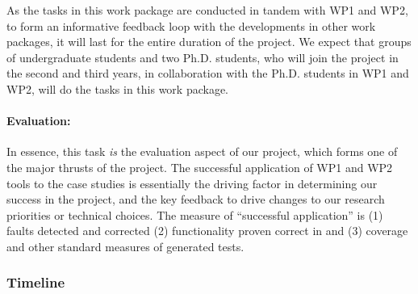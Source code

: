 As the tasks in this work package are conducted in tandem with WP1 and WP2, to form an informative feedback loop with the developments in other work packages, it will last for the entire duration of the project.
We expect that groups of undergraduate students and two Ph.D. students, who will join the project in the second and third years, in collaboration with the Ph.D. students in WP1 and WP2, will do the tasks in this work package.

\paragraph{Evaluation:} In essence, this task \emph{is} the evaluation
aspect of our project, which forms one of the major thrusts of
the project.  The successful application of WP1 and WP2 tools to the case studies is
essentially the driving factor in determining our success in the
project, and the key feedback to drive changes to our research
priorities or technical choices.  The measure of ``successful
application'' is (1) faults detected and corrected (2) functionality
proven correct in \framac and (3) coverage and other standard measures
of generated tests.


\subsubsection{Timeline}
\label{sec:time-line}

